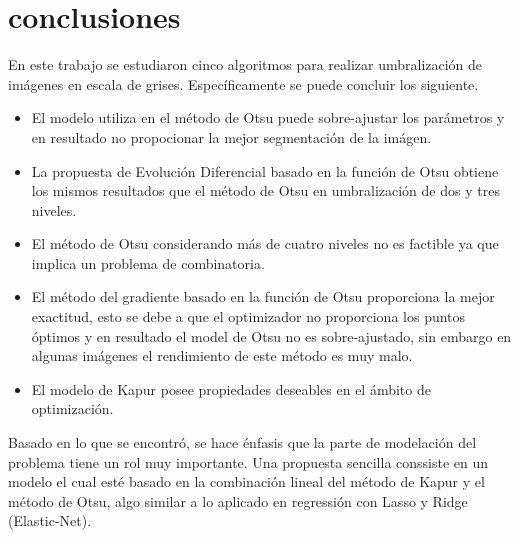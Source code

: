 \documentclass[preprint,12pt]{elsarticle}
\begin{document}
\section{conclusiones}

En este trabajo se estudiaron cinco algoritmos para realizar umbralización de imágenes en escala de grises.
%
Específicamente se  puede concluir los siguiente.
%
\begin{itemize}
 \item El modelo utiliza en el método de Otsu puede sobre-ajustar los parámetros y en resultado no propocionar la mejor segmentación de la imágen.
 \item La propuesta de Evolución Diferencial basado en la función de Otsu obtiene los mismos resultados que el método de Otsu en umbralización de dos y tres niveles.
 \item El método de Otsu considerando más de cuatro niveles no es factible ya que implica un problema de combinatoria.
 \item El método del gradiente basado en la función de Otsu proporciona la mejor exactitud, esto se debe a que el optimizador no proporciona los puntos óptimos y en resultado el model de Otsu no es sobre-ajustado, sin embargo en algunas imágenes el rendimiento de este método es muy malo.
 \item El modelo de Kapur posee propiedades deseables en el ámbito de optimización.
\end{itemize}

Basado en lo que se encontró, se hace énfasis que la parte de modelación del problema tiene un rol muy importante.
%
Una propuesta sencilla conssiste en un modelo el cual esté basado en la combinación lineal del método de Kapur y el método de Otsu, algo similar a lo aplicado en regressión con Lasso y Ridge (Elastic-Net).
%


\linenumbers




\end{document}
